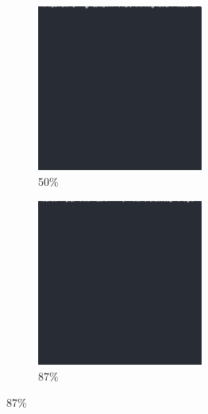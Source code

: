 \documentclass[12pt, fleqn]{report}                             %
\theoremstyle{break}                                            %
\begin{document}
\begin{figure}[ht!]
\begin{subfigure}[b]{0.4\linewidth}
          \includegraphics[width=0.6\textwidth]{Images/40/c.png}
          \caption{50\%}
        \end{subfigure}
        \begin{subfigure}[b]{0.4\linewidth}
          \includegraphics[width=0.6\textwidth]{Images/40/d.png}
          \caption{87\%}
        \end{subfigure}
      \end{figure}
\end{document}
